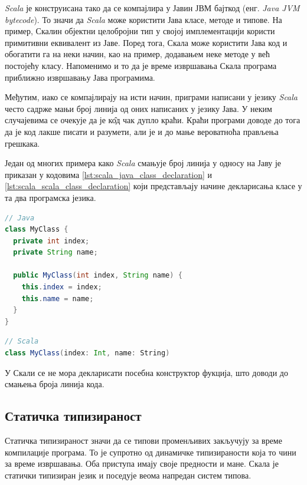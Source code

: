 \documentclass[12pt,oneside]{memoir}
\begin{document}
\textit{Scala} је конструисана тако да се компајлира у Јавин ЈВМ бајткод (енг. \textit{Java JVM bytecode}). То значи да \textit{Scala} може користити Јава класе, методе и типове. На пример, Скалин објектни целобројни тип у својој имплементацији користи примитивни еквивалент из Јаве. Поред тога, Скала може користити Јава код и обогатити га на неки начин, као на пример, додавањем неке методе у већ постојећу класу. Напоменимо и то да је време извршавања Скала програма приближно извршавању Јава програмима. \cite{scala_prog}

Међутим, иако се компајлирају на исти начин, приграми написани у језику \textit{Scala} често садрже мањи број линија од оних написаних у језику Јава. У неким случајевима се очекује да је к\^{о}д чак дупло краћи. Краћи програми доводе до тога да је код лакше писати и разумети, али је и до мање вероватноћа прављења грешкака. \cite{scala_prog}

Један од многих примера како \textit{Scala} смањује број линија у односу на Јаву је приказан у кодовима \ref{lst:scala_java_class_declaration} и \ref{lst:scala_scala_class_declaration} који представљају начине декларисања класе у та два програмска језика.

\begin{lstlisting}[caption={Декларација класе у језику Јава}, language=Java, label={lst:scala_java_class_declaration}]
// Java
class MyClass {  
  private int index;
  private String name;
  
  public MyClass(int index, String name) {
    this.index = index;
    this.name = name;
  }
}
\end{lstlisting}

\begin{lstlisting}[caption={Декларација класе у језику Scala}, language=Scala, label={lst:scala_scala_class_declaration}]
// Scala
class MyClass(index: Int, name: String)

\end{lstlisting}

У Скали се не мора декларисати посебна конструктор фукција, што доводи до смањења броја линија кода. \cite{scala_prog}

\subsection{Статичка типизираност}
\label{subsec:scala_stat_tip}

Статичка типизираност значи да се типови променљивих закључују за време компилације програма. То је супротно од динамичке типизираности која то чини за време извршавања. Оба приступа имају своје предности и мане. Скала је статички типизиран језик и поседује веома напредан систем типова.
\end{document}
